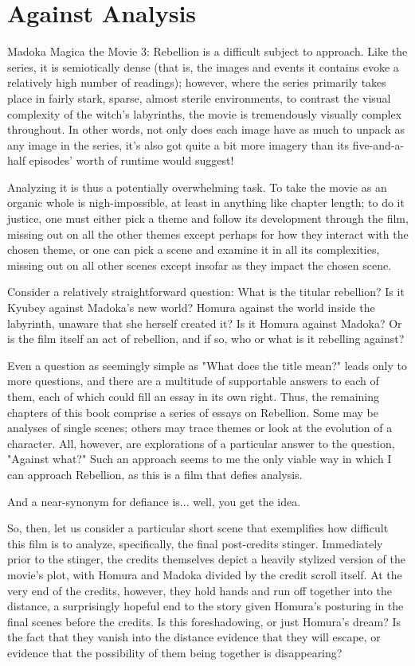 \chapter{Against Analysis}
Madoka Magica the Movie 3: Rebellion is a difficult subject to approach. Like the series, it is semiotically dense (that is, the images and events it contains evoke a relatively high number of readings); however, where the series primarily takes place in fairly stark, sparse, almost sterile environments, to contrast the visual complexity of the witch's labyrinths, the movie is tremendously visually complex throughout. In other words, not only does each image have as much to unpack as any image in the series, it's also got quite a bit more imagery than its five-and-a-half episodes' worth of runtime would suggest!

Analyzing it is thus a potentially overwhelming task. To take the movie as an organic whole is nigh-impossible, at least in anything like chapter length; to do it justice, one must either pick a theme and follow its development through the film, missing out on all the other themes except perhaps for how they interact with the chosen theme, or one can pick a scene and examine it in all its complexities, missing out on all other scenes except insofar as they impact the chosen scene.

Consider a relatively straightforward question: What is the titular rebellion? Is it Kyubey against Madoka's new world? Homura against the world inside the labyrinth, unaware that she herself created it? Is it Homura against Madoka? Or is the film itself an act of rebellion, and if so, who or what is it rebelling against?

Even a question as seemingly simple as "What does the title mean?" leads only to more questions, and there are a multitude of supportable answers to each of them, each of which could fill an essay in its own right. Thus, the remaining chapters of this book comprise a series of essays on Rebellion. Some may be analyses of single scenes; others may trace themes or look at the evolution of a character. All, however, are explorations of a particular answer to the question, "Against what?" Such an approach seems to me the only viable way in which I can approach Rebellion, as this is a film that defies analysis.

And a near-synonym for defiance is... well, you get the idea.

So, then, let us consider a particular short scene that exemplifies how difficult this film is to analyze, specifically, the final post-credits stinger. Immediately prior to the stinger, the credits themselves depict a heavily stylized version of the movie's plot, with Homura and Madoka divided by the credit scroll itself. At the very end of the credits, however, they hold hands and run off together into the distance, a surprisingly hopeful end to the story given Homura's posturing in the final scenes before the credits. Is this foreshadowing, or just Homura's dream? Is the fact that they vanish into the distance evidence that they will escape, or evidence that the possibility of them being together is disappearing?

